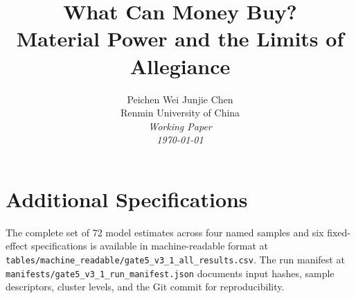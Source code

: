 \documentclass[12pt,a4paper]{article}
\title{What Can Money Buy?\\
Material Power and the Limits of Allegiance}
\author{
Peichen Wei \quad Junjie Chen\\[4pt]
Renmin University of China\\[6pt]
\textit{Working Paper}\\
\textit{\today}
}
\date{}
\begin{document}
\maketitle


\clearpage











\clearpage


\clearpage
\appendix
\section{Additional Specifications}
The complete set of 72 model estimates across four named samples and six fixed-effect specifications is available in machine-readable format at \texttt{tables/machine\_readable/gate5\_v3\_1\_all\_results.csv}. The run manifest at \texttt{manifests/gate5\_v3\_1\_run\_manifest.json} documents input hashes, sample descriptors, cluster levels, and the Git commit for reproducibility.


\end{document}
